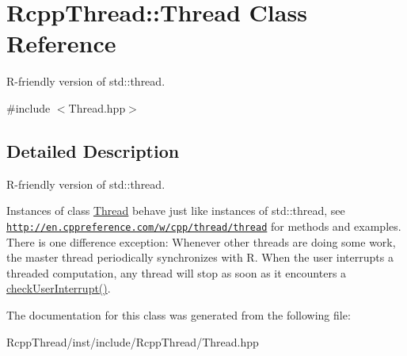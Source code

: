 \hypertarget{class_rcpp_thread_1_1_thread}{}\section{Rcpp\+Thread\+:\+:Thread Class Reference}
\label{class_rcpp_thread_1_1_thread}


R-\/friendly version of {\ttfamily std\+::thread}.  




{\ttfamily \#include $<$Thread.\+hpp$>$}



\subsection{Detailed Description}
R-\/friendly version of {\ttfamily std\+::thread}. 

Instances of class {\ttfamily \hyperlink{class_rcpp_thread_1_1_thread}{Thread}} behave just like instances of {\ttfamily std\+::thread}, see \href{http://en.cppreference.com/w/cpp/thread/thread}{\tt http\+://en.\+cppreference.\+com/w/cpp/thread/thread} for methods and examples. There is one difference exception\+: Whenever other threads are doing some work, the master thread periodically synchronizes with R. When the user interrupts a threaded computation, any thread will stop as soon as it encounters a {\ttfamily \hyperlink{namespace_rcpp_thread_ade67c61ac7a988425ba74d9ac56b4327}{check\+User\+Interrupt()}}. 

The documentation for this class was generated from the following file\+:\begin{DoxyCompactItemize}
\item 
Rcpp\+Thread/inst/include/\+Rcpp\+Thread/Thread.\+hpp\end{DoxyCompactItemize}
